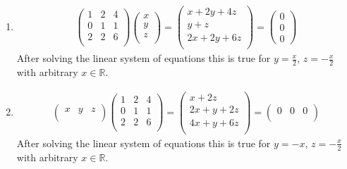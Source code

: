 \documentclass{article}
\begin{document}
\begin{enumerate}
    \item \begin{align*}
        \begin{pmatrix}
            1 & 2 & 4 \\ 0 & 1 & 1 \\ 2 & 2 & 6 \\
        \end{pmatrix}\begin{pmatrix}
            x \\ y \\ z \\
        \end{pmatrix} = \begin{pmatrix}
            x + 2y + 4z \\ y + z \\ 2x + 2y + 6z \\ 
        \end{pmatrix} = \begin{pmatrix}
            0 \\ 0 \\ 0
        \end{pmatrix}
    \end{align*} 
    After solving the linear system of equations this is true for $y = \frac{x}{2}$, $z = -\frac{x}{2}$ with arbitrary $x \in \mathbb{R}$.
    
    \item \begin{align*}
        \begin{pmatrix}
            x & y & z \\
        \end{pmatrix}\begin{pmatrix}
            1 & 2 & 4 \\ 0 & 1 & 1 \\ 2 & 2 & 6 \\
        \end{pmatrix} = \begin{pmatrix}
            x + 2z \\ 2x + y + 2z \\ 4x + y + 6z \\
        \end{pmatrix} = \begin{pmatrix}
            0 & 0 & 0 \\
        \end{pmatrix}
    \end{align*}
    After solving the linear system of equations this is true for $y = -x$, $z = -\frac{x}{2}$ with arbitrary $x \in \mathbb{R}$.


\end{enumerate}
\end{document}
